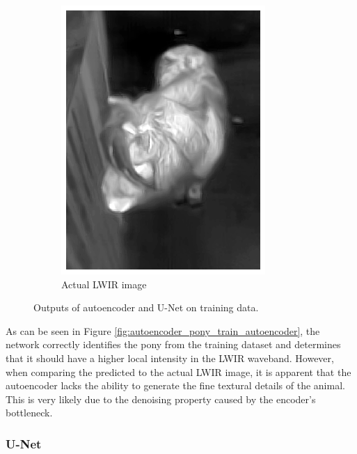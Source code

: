 \documentclass{l4proj}
\begin{document}
\begin{figure}[ht]
\begin{subfigure}[h!]{0.22\textwidth}
    \includegraphics[width=\textwidth]{images/autoencoder/train/lwir.png}
    \caption{Actual LWIR image}
  \end{subfigure}
  \caption{Outputs of autoencoder and U-Net on training data.}
  \label{fig:autoencoder_pony_train}
\end{figure}

As can be seen in Figure \ref{fig:autoencoder_pony_train_autoencoder}, the network correctly identifies the pony from the training dataset and determines that it should have a higher local intensity in the LWIR waveband. However, when comparing the predicted to the actual LWIR image, it is apparent that the autoencoder lacks the ability to generate the fine textural details of the animal. This is very likely due to the denoising property caused by the encoder's bottleneck.

\subsubsection{U-Net}
\end{document}
